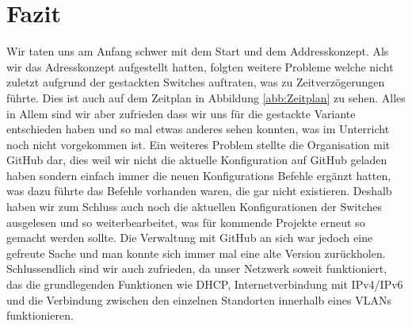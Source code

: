 \documentclass[11pt,a4paper]{scrreprt}
\begin{document}
\newpage
\chapter{Fazit}
Wir taten uns am Anfang schwer mit dem Start und dem Addresskonzept. Als wir das Adresskonzept aufgestellt hatten, folgten weitere Probleme welche nicht zuletzt aufgrund der gestackten Switches auftraten, was zu Zeitverzögerungen führte. Dies ist auch auf dem Zeitplan in Abbildung \ref{abb:Zeitplan} zu sehen. Alles in Allem sind wir aber zufrieden dass wir uns für die gestackte Variante entschieden haben und so mal etwas anderes sehen konnten, was im Unterricht noch nicht vorgekommen ist. Ein weiteres Problem stellte die Organisation mit GitHub dar, dies weil wir nicht die aktuelle Konfiguration auf GitHub geladen haben sondern einfach immer die neuen Konfigurations Befehle ergänzt hatten, was dazu führte das Befehle vorhanden waren, die gar nicht existieren. Deshalb haben wir zum Schluss auch noch die aktuellen Konfigurationen der Switches ausgelesen und so weiterbearbeitet, was für kommende Projekte erneut so gemacht werden sollte. Die Verwaltung mit GitHub an sich war jedoch eine gefreute Sache und man konnte sich immer mal eine alte Version zurückholen. Schlussendlich sind wir auch zufrieden, da unser Netzwerk soweit funktioniert, das die grundlegenden Funktionen wie DHCP, Internetverbindung mit IPv4/IPv6 und die Verbindung zwischen den einzelnen Standorten innerhalb eines \acs{VLAN}s funktionieren.

\appendix
{}
\end{document}
